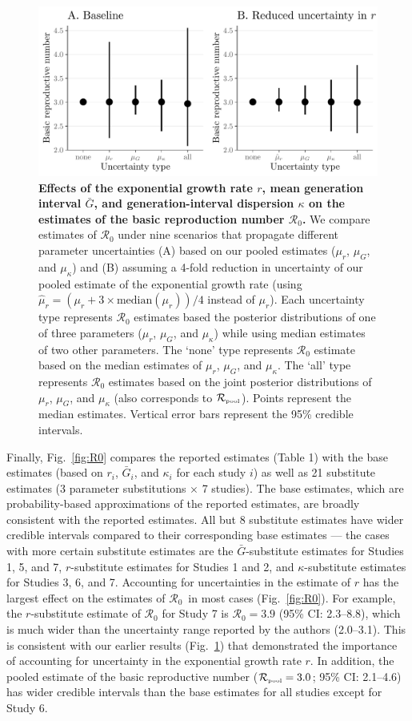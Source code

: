 \documentclass[12pt]{article}
\newcommand{\fref}[1]{Fig.~\ref{fig:#1}}
\newcommand{\Ro}{\ensuremath{{\mathcal R}_{0}}\xspace}
\newcommand{\Rpool}{\ensuremath{{\mathcal R}_{\textrm{\tiny{pool}}}}\xspace}
\begin{document}
\begin{figure}[!ht]
\includegraphics[width=\textwidth]{figure2.pdf}
\caption{
  \textbf{Effects of the exponential growth rate $r$, mean generation interval $\bar G$, and generation-interval dispersion $\kappa$ on the estimates of the basic reproduction number \Ro.}
We compare estimates of \Ro under nine scenarios that propagate different parameter uncertainties (A) based on our pooled estimates ($\mu_r$, $\mu_G$, and $\mu_\kappa$) and (B) assuming a 4-fold reduction in uncertainty of our pooled estimate of the exponential growth rate (using $\hat{\mu}_r = (\mu_r + 3\times\mathrm{median}(\mu_r))/4$ instead of $\mu_r$).
Each uncertainty type represents \Ro estimates based the posterior distributions of one of three parameters ($\mu_r$, $\mu_G$, and $\mu_\kappa$) while using median estimates of two other parameters.
The `none' type represents \Ro estimate based on the median estimates of $\mu_r$, $\mu_G$, and $\mu_\kappa$.
The `all' type represents \Ro estimates based on the joint posterior distributions of  $\mu_r$, $\mu_G$, and $\mu_\kappa$ (also corresponds to \Rpool).
Points represent the median estimates.
Vertical error bars represent the 95\% credible intervals.
}
\label{fig:eff}
\end{figure}

Finally, \fref{R0} compares the reported estimates (Table 1) with the base estimates (based on $r_i$, $\bar G_i$, and $\kappa_i$ for each study $i$) as well as 21 substitute estimates (3 parameter substitutions $\times$ 7 studies).
The base estimates, which are probability-based approximations of the reported estimates, are broadly consistent with the reported estimates.
All but 8 substitute estimates have wider credible intervals compared to their corresponding base estimates --- the cases with more certain substitute estimates are the $\bar G$-substitute estimates for Studies 1, 5, and 7, $r$-substitute estimates for Studies 1 and 2, and  $\kappa$-substitute estimates for Studies 3, 6, and 7.
Accounting for uncertainties in the estimate of $r$ has the largest effect on the estimates of \Ro\ in most cases (\fref{R0}).
For example, the $r$-substitute estimate of \Ro for Study 7 is $\Ro = 3.9$ (95\% CI: 2.3--8.8), which is much wider than the uncertainty range reported by the authors (2.0--3.1).
This is consistent with our earlier results (\fref{eff}) that demonstrated the importance of accounting for uncertainty in the exponential growth rate $r$.
In addition, the pooled estimate of the basic reproductive number ($\Rpool = 3.0$; 95\% CI: 2.1--4.6) has wider credible intervals than the base estimates for all studies except for Study 6.
\end{document}
